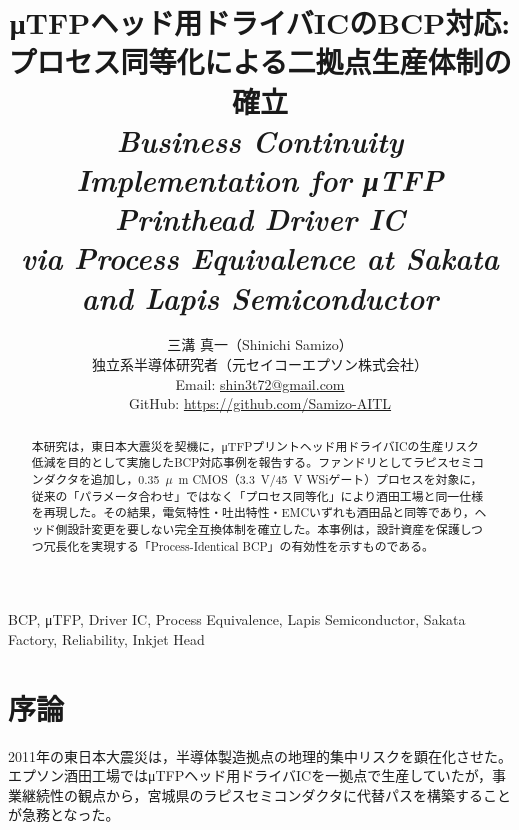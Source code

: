 \documentclass[conference]{IEEEtran}
\newcommand{\micro}{\ensuremath{\mu}} %
\begin{document}
\title{%
μTFPヘッド用ドライバICのBCP対応:\\
プロセス同等化による二拠点生産体制の確立\\[2mm]
\textit{Business Continuity Implementation for μTFP Printhead Driver IC\\
via Process Equivalence at Sakata and Lapis Semiconductor}
}

\author{%
三溝 真一（Shinichi Samizo）\\
独立系半導体研究者（元セイコーエプソン株式会社）\\
Email: \href{mailto:shin3t72@gmail.com}{shin3t72@gmail.com} \\
GitHub: \url{https://github.com/Samizo-AITL}
}

\maketitle

\begin{abstract}
本研究は，東日本大震災を契機に，μTFPプリントヘッド用ドライバICの生産リスク低減を目的として実施したBCP対応事例を報告する。ファンドリとしてラピスセミコンダクタを追加し，\SI{0.35}{\micro\meter} CMOS（\SI{3.3}{\volt}/\SI{45}{\volt} WSiゲート）プロセスを対象に，従来の「パラメータ合わせ」ではなく「プロセス同等化」により酒田工場と同一仕様を再現した。その結果，電気特性・吐出特性・EMCいずれも酒田品と同等であり，ヘッド側設計変更を要しない完全互換体制を確立した。本事例は，設計資産を保護しつつ冗長化を実現する「Process-Identical BCP」の有効性を示すものである。
\end{abstract}

\begin{IEEEkeywords}
BCP, μTFP, Driver IC, Process Equivalence, Lapis Semiconductor, Sakata Factory, Reliability, Inkjet Head
\end{IEEEkeywords}

\section{序論}
2011年の東日本大震災は，半導体製造拠点の地理的集中リスクを顕在化させた。エプソン酒田工場ではμTFPヘッド用ドライバICを一拠点で生産していたが，事業継続性の観点から，宮城県のラピスセミコンダクタに代替パスを構築することが急務となった。
\end{document}
